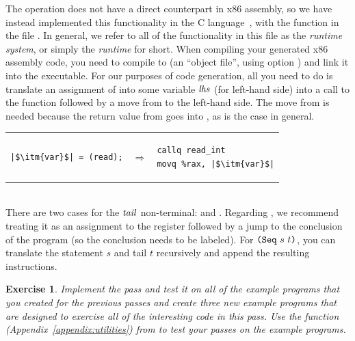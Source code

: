 \documentclass[11pt]{book}
\newtheorem{exercise}[theorem]{Exercise}
\begin{document}
The  operation does not have a direct counterpart in x86
assembly, so we have instead implemented this functionality in the C
language~\citep{Kernighan:1988nx}, with the function 
in the file . In general, we refer to all of the
functionality in this file as the \emph{runtime system}, or simply the
\emph{runtime} for short. When compiling your generated x86 assembly
code, you need to compile  to  (an
``object file'', using  option ) and link it into
the executable. For our purposes of code generation, all you need to
do is translate an assignment of  into some variable
$\mathit{lhs}$ (for left-hand side) into a call to the 
function followed by a move from  to the left-hand side.
The move from  is needed because the return value from
 goes into , as is the case in general.  \\
\begin{tabular}{lll}
\begin{minipage}{0.3\textwidth}
\begin{lstlisting}
|$\itm{var}$| = (read);
\end{lstlisting}
\end{minipage}
&
$\Rightarrow$
&
\begin{minipage}{0.3\textwidth}
\begin{lstlisting}
callq read_int
movq %rax, |$\itm{var}$|
\end{lstlisting}
\end{minipage}
\end{tabular} \\

There are two cases for the $\mathit{tail}$ non-terminal:  and
. Regarding , we recommend treating it as an
assignment to the  register followed by a jump to the
conclusion of the program (so the conclusion needs to be labeled).
For $\texttt{(Seq}~s~t\texttt{)}$, you can translate the statement $s$ and tail $t$
recursively and append the resulting instructions.

\begin{exercise}
\normalfont
Implement the  pass and test it on all of the
example programs that you created for the previous passes and create
three new example programs that are designed to exercise all of the
interesting code in this pass. Use the  function
(Appendix~\ref{appendix:utilities}) from  to test
your passes on the example programs.
\end{exercise}
\end{document}
